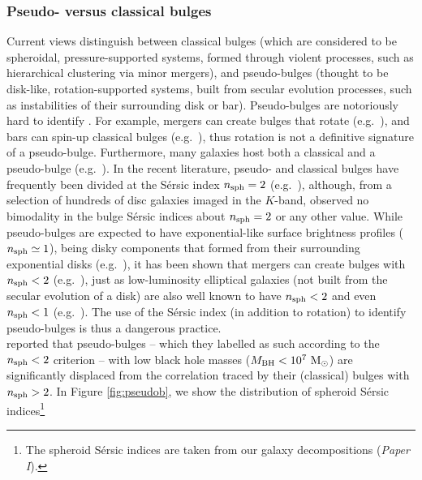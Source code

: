 \documentclass[preprint2]{emulateapj}
\begin{document}
\subsubsection{Pseudo- versus classical bulges}
Current views distinguish between classical bulges (which are considered to be spheroidal, pressure-supported systems, 
formed through violent processes, such as hierarchical clustering via minor mergers), 
and pseudo-bulges (thought to be disk-like, rotation-supported systems, 
built from secular evolution processes, such as instabilities of their surrounding disk or bar). 
Pseudo-bulges are notoriously hard to identify \citep{graham2013review,graham2014review,graham2015pseudo,graham2015review}.
For example, mergers can create bulges that rotate (e.g.~\citealt{bekki2010,keselmannusser2012}), 
and bars can spin-up classical bulges (e.g.~\citealt{saha2012}), 
thus rotation is not a definitive signature of a pseudo-bulge. 
Furthermore, many galaxies host both a classical and a pseudo-bulge (e.g.~\citealt{erwin2003,erwin2015,
athanassoula2005,gadotti2009,macarthur2009,erwin2010,dosanjosdasilva2013,seidel2015}). 
In the recent literature, pseudo- and classical bulges have frequently been divided at the 
S\'ersic index $n_{\rm sph}=2$ (e.g.~\citealt{sani2011,beifiori2012}), 
although, from a selection of hundreds of disc galaxies imaged in the $K$-band, 
\cite{grahamworley2008} observed no bimodality in the bulge S\'ersic indices about $n_{\rm sph}=2$ or any other value. 
While pseudo-bulges are expected to have exponential-like surface brightness profiles ($n_{\rm sph} \simeq 1$), 
being disky components that formed from their surrounding exponential disks 
(e.g.~\citealt{bardeen1975,hohl1975,combessanders1981,combes1990,pfennigerfriedli1991}), 
it has been shown that mergers can create bulges with $n_{\rm sph}<2$
(e.g.~\citealt{elichemoral2011,scannapieco2011,querejeta2015}), 
just as low-luminosity elliptical galaxies (not built from the secular evolution of a disk)
are also well known to have $n_{\rm sph}<2$ and even $n_{\rm sph}<1$ (e.g.~\citealt{davies1988,youngcurrie1994,jerjen2000}). 
The use of the S\'ersic index (in addition to rotation) to identify pseudo-bulges is thus a dangerous practice. \\
\cite{sani2011} reported that pseudo-bulges -- which they labelled as such according to the $n_{\rm sph}<2$ criterion -- 
with low black hole masses ($M_{\rm BH} < 10^7\rm~M_\odot$) are significantly displaced from the correlation 
traced by their (classical) bulges with $n_{\rm sph}>2$. 
In Figure \ref{fig:pseudob}, we show the distribution of spheroid S\'ersic indices\footnote{The spheroid S\'ersic indices 
are taken from our galaxy decompositions (\emph{Paper I}).} 
\end{document}

